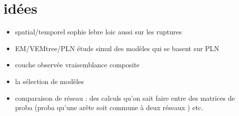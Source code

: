 \section{idées}
\begin{itemize}
\item spatial/temporel sophie lebre loic aussi sur les ruptures
\item EM/VEMtree/PLN étude simul des modèles qui se basent sur PLN
\item couche observée vraisemblance composite
\item la sélection de modèles
\item comparaison de réseau : des calculs qu'on sait faire entre des matrices de proba (proba qu'une arête soit commune à deux réseaux ) etc.
\end{itemize} 